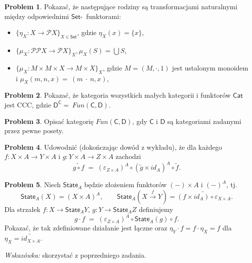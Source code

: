 \documentclass[9pt]{amsart}
\theoremstyle{plain}
\theoremstyle{definition}
\newtheorem{problem}{Problem}
\numberwithin{equation}{section}
\begin{document}
\begin{problem}
Pokazać, że następujące rodziny są transformacjami naturalnymi między odpowiednimi $\mathsf{Set}$-~funktorami:
\begin{itemize}
\item $\{\eta_X:X\to \mathcal{P}X\}_{X\in \mathsf{Set}}$, gdzie $\eta_X(x) = \{x\}$,
\item $\{\mu_X: \mathcal{P}\mathcal{P}X\to \mathcal{P}X\}_{X}, \mu_X(S) =\bigcup S$,
\item $\{\mu_{X}:M\times M\times X\to M\times X\}_{X}$, gdzie $M=(M,\cdot,1)$ jest ustalonym monoidem i $\mu_{X}(m,n,x) =~(m~\cdot~n,x)$,
\end{itemize}
\end{problem}

\begin{problem}
Pokazać, że kategoria wszystkich małych kategorii i funktorów $\mathsf{Cat}$ jest CCC, gdzie $\mathsf{D}^\mathsf{C} =~Fun(\mathsf{C},\mathsf{D})$. 
\end{problem}

\begin{problem}
Opisać kategorię $Fun(\mathsf{C},\mathsf{D})$, gdy $\mathsf{C}$ i $\mathsf{D}$ są kategoriami zadanymi przez pewne posety.
\end{problem}

\begin{problem}\label{zad:transpozycja}
Udowodnić (dokończając dowód z wykładu), że dla każdego $f\colon X\times A\to Y\times A$ i $g\colon Y\times A\to Z\times A$ zachodzi
\[
\widetilde{g\circ f} \;=\; (\varepsilon_{Z\times A})^A \circ (\widetilde{g}\times id_A)^A \circ \widetilde{f}.
\]
\end{problem}

\begin{problem}
Niech $\mathsf{State}_A$ będzie złożeniem funktorów $(-)\times A$ i $(-)^A$, tj.
\[
\mathsf{State}_A(X) = (X\times A)^A, \qquad \mathsf{State}_A(X\xrightarrow{f} Y) = \widetilde{(f\times id_A)\circ\varepsilon_{X\times A}}.
\]
Dla strzałek $f\colon X\to\mathsf{State}_A Y$, $g\colon Y\to\mathsf{State}_A Z$ definiujemy
\[
g\cdot f \;=\; (\varepsilon_{Z\times A})^A \circ \mathsf{State}_A(g) \circ f.
\]
Pokazać, że tak zdefiniowane działanie jest łączne oraz $\eta_Y\cdot f = f\cdot \eta_X = f$ dla $\eta_X = \widetilde{id_{X\times A}}$.

\emph{Wskazówka:} skorzystać z poprzedniego zadania.
\end{problem}
\end{document}
